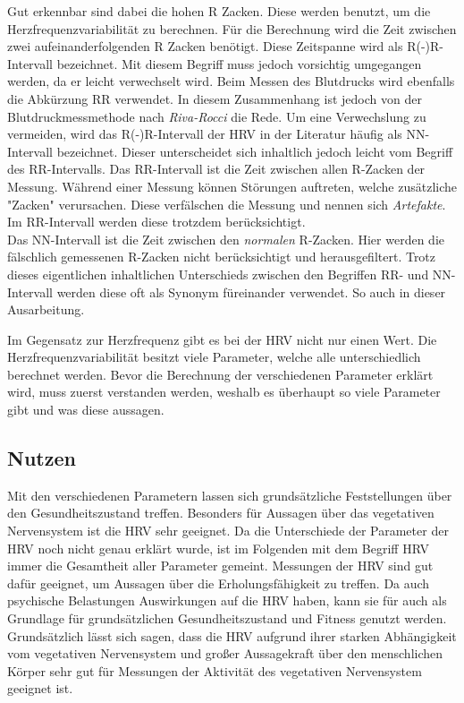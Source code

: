  Gut erkennbar sind dabei die hohen R Zacken. Diese werden benutzt, um die Herzfrequenzvariabilität zu berechnen.
 Für die Berechnung wird die Zeit zwischen zwei aufeinanderfolgenden R Zacken benötigt. Diese Zeitspanne wird als R(-)R-Intervall bezeichnet. Mit diesem Begriff muss jedoch vorsichtig umgegangen werden, da er leicht verwechselt wird. Beim Messen des Blutdrucks wird ebenfalls die Abkürzung RR verwendet. In diesem Zusammenhang ist jedoch von der Blutdruckmessmethode nach \textit{Riva-Rocci} die Rede. Um eine Verwechslung zu vermeiden, wird das R(-)R-Intervall der HRV in der Literatur häufig als NN-Intervall bezeichnet. Dieser unterscheidet sich inhaltlich jedoch leicht vom Begriff des RR-Intervalls. 
 Das RR-Intervall ist die Zeit zwischen allen R-Zacken der Messung. Während einer Messung können Störungen auftreten, welche zusätzliche "Zacken" verursachen. Diese verfälschen die Messung und nennen sich \textit{Artefakte}\cite{artefakt}. Im RR-Intervall werden diese trotzdem berücksichtigt.\\
 Das NN-Intervall ist die Zeit zwischen den \textit{normalen} R-Zacken. Hier werden die fälschlich gemessenen R-Zacken nicht berücksichtigt und herausgefiltert. Trotz dieses eigentlichen inhaltlichen Unterschieds zwischen den Begriffen RR- und NN-Intervall werden diese oft als Synonym füreinander verwendet. So auch in dieser Ausarbeitung.\cite{rr}\cite{kubios}
 

 Im Gegensatz zur Herzfrequenz gibt es bei der HRV nicht nur einen Wert. Die Herzfrequenzvariabilität besitzt viele Parameter, welche alle unterschiedlich berechnet werden. Bevor die Berechnung der verschiedenen Parameter erklärt wird, muss zuerst verstanden werden, weshalb es überhaupt so viele Parameter gibt und was diese aussagen.
 
 \subsection{Nutzen}
 Mit den verschiedenen Parametern lassen sich grundsätzliche Feststellungen über den Gesundheitszustand treffen. Besonders für Aussagen über das vegetativen Nervensystem ist die HRV sehr geeignet. Da die Unterschiede der Parameter der HRV noch nicht genau erklärt wurde, ist im Folgenden mit dem Begriff HRV immer die Gesamtheit aller Parameter gemeint. Messungen der HRV sind gut dafür geeignet, um Aussagen über die Erholungsfähigkeit zu treffen. Da auch psychische Belastungen Auswirkungen auf die HRV haben, kann sie für auch als Grundlage für grundsätzlichen Gesundheitszustand und Fitness genutzt werden. \\
Grundsätzlich lässt sich sagen, dass die HRV aufgrund ihrer starken Abhängigkeit vom vegetativen Nervensystem und großer Aussagekraft über den menschlichen Körper sehr gut für Messungen der Aktivität des vegetativen Nervensystem geeignet ist. 
 

